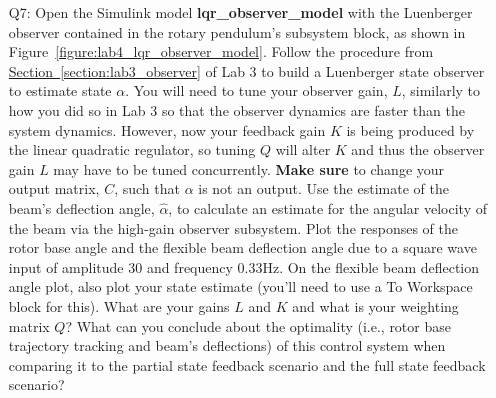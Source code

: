 \begin{enumerate}
    \item[Q7:] Open the Simulink model \textbf{lqr\_observer\_model} with the Luenberger observer contained in the rotary pendulum's subsystem block, as shown in Figure~\ref{figure:lab4_lqr_observer_model}. Follow the procedure from \hyperref[section:lab3_observer]{Section~\ref{section:lab3_observer}} of Lab 3 to build a Luenberger state observer to estimate state $\alpha$. You will need to tune your observer gain, $L$, similarly to how you did so in Lab 3 so that the observer dynamics are faster than the system dynamics. However, now your feedback gain $K$ is being produced by the linear quadratic regulator, so tuning $Q$ will alter $K$ and thus the observer gain $L$ may have to be tuned concurrently. \textbf{Make sure} to change your output matrix, $C$, such that $\alpha$ is not an output. Use the estimate of the beam's deflection angle, $\hat{\alpha}$, to calculate an estimate for the angular velocity of the beam via the high-gain observer subsystem. Plot the responses of the rotor base angle and the flexible beam deflection angle due to a square wave input of amplitude 30 and frequency 0.33Hz. On the flexible beam deflection angle plot, also plot your state estimate (you'll need to use a To Workspace block for this). What are your gains $L$ and $K$ and what is your weighting matrix $Q$? What can you conclude about the optimality (i.e., rotor base trajectory tracking and beam's deflections) of this control system when comparing it to the partial state feedback scenario and the full state feedback scenario?\\

\end{enumerate}
